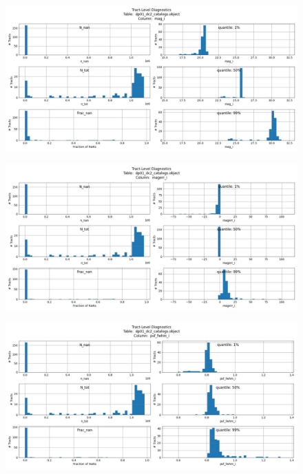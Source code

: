 \documentclass[DM,authoryear,toc]{lsstdoc}
\begin{document}
\begin{figure}[h]
\centering
\includegraphics[width=1.0\linewidth]{Plots/TAP_verify_DP01.dp01_dc2_catalogs.object.mag_i.pdf}
\caption{}
\label{fig:object_mag_i}
\end{figure}

\begin{figure}[h]
\centering
\includegraphics[width=1.0\linewidth]{Plots/TAP_verify_DP01.dp01_dc2_catalogs.object.magerr_i.pdf}
\caption{}
\label{fig:object_magerr_i}
\end{figure}

\begin{figure}[h]
\centering
\includegraphics[width=1.0\linewidth]{Plots/TAP_verify_DP01.dp01_dc2_catalogs.object.psf_fwhm_i.pdf}
\caption{}
\label{fig:object_psf_fwhm_i}
\end{figure}
\end{document}
